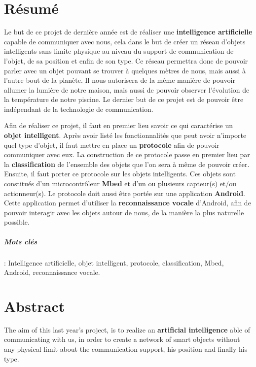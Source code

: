 ﻿
\chapter*{Résumé}
Le but de ce projet de dernière année est de réaliser une \textbf{intelligence artificielle} capable de communiquer avec nous, cela dans le but de créer un réseau d'objets intelligents sans limite physique au niveau du support de communication de l'objet, de sa position et enfin de son type. Ce réseau permettra donc de pouvoir parler avec un objet pouvant se trouver à quelques mètres de nous, mais aussi à l'autre bout de la planète. Il nous autorisera de la même manière de pouvoir allumer la lumière de notre maison, mais aussi de pouvoir observer l'évolution de la température de notre piscine. Le dernier but de ce projet est de pouvoir être indépendant de la technologie de communication.

Afin de réaliser ce projet, il faut en premier lieu savoir ce qui caractérise un \textbf{objet intelligent}. Après avoir listé les fonctionnalités que peut avoir n'importe quel type d'objet, il faut mettre en place un \textbf{protocole} afin de pouvoir communiquer avec eux. La construction de ce protocole passe en premier lieu par la \textbf{classification} de l'ensemble des objets que l'on sera à même de pouvoir créer. Ensuite, il faut porter ce protocole sur les objets intelligents. Ces objets sont constitués d'un microcontrôleur \textbf{Mbed} et d'un ou plusieurs capteur(s) et/ou actionneur(s). Le protocole doit aussi être portée sur une application \textbf{Android}. Cette application permet d'utiliser la \textbf{reconnaissance vocale} d'Android, afin de pouvoir interagir avec les objets autour de nous, de la manière la plus naturelle possible.
	
   \paragraph{Mots clés}: Intelligence artificielle, objet intelligent, protocole, classification, Mbed, Android, reconnaissance vocale.
   
\clearemptydoublepage
   
 \chapter*{Abstract}
The aim of this last year's project, is to realize an \textbf{artificial intelligence} able of communicating with us, in order to create a network of smart objects without any physical limit about the communication support, his position and finally his type.

